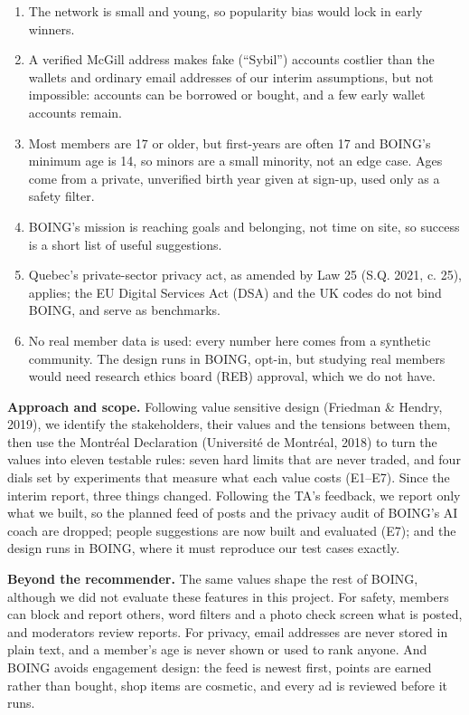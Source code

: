 \documentclass[11pt,letterpaper]{article}
\begin{document}
\begin{enumerate}
\item The network is small and young, so popularity bias would lock in early winners.
\item A verified McGill address makes fake (``Sybil'') accounts costlier than the wallets and ordinary email
addresses of our interim assumptions, but not impossible: accounts can be borrowed or bought, and a few early
wallet accounts remain.
\item Most members are 17 or older, but first-years are often 17 and BOING's minimum age is 14, so minors are
a small minority, not an edge case. Ages come from a private, unverified birth year given at sign-up, used
only as a safety filter.
\item BOING's mission is reaching goals and belonging, not time on site, so success is a short list of useful
suggestions.
\item Quebec's private-sector privacy act, as amended by Law 25 (S.Q. 2021, c. 25), applies; the EU Digital
Services Act (DSA) and the UK codes do not bind BOING, and serve as benchmarks.
\item No real member data is used: every number here comes from a synthetic community. The design runs in
BOING, opt-in, but studying real members would need research ethics board (REB) approval, which we do not
have.
\end{enumerate}

\textbf{Approach and scope.} Following value sensitive design (Friedman \& Hendry, 2019), we identify the
stakeholders, their values and the tensions between them, then use the Montréal Declaration (Université de
Montréal, 2018) to turn the values into eleven testable rules: seven hard limits that are never traded, and
four dials set by experiments that measure what each value costs (E1--E7). Since the interim report, three
things changed. Following the TA's feedback, we report only what we built, so the planned feed of posts and
the privacy audit of BOING's AI coach are dropped; people suggestions are now built and evaluated (E7); and
the design runs in BOING, where it must reproduce our test cases exactly.

\textbf{Beyond the recommender.} The same values shape the rest of BOING, although we did not evaluate these
features in this project. For safety, members can block and report others, word filters and a photo check screen
what is posted, and moderators review reports. For privacy, email addresses are never stored in plain text, and a
member's age is never shown or used to rank anyone. And BOING avoids engagement design: the feed is newest first,
points are earned rather than bought, shop items are cosmetic, and every ad is reviewed before it runs.
\end{document}
